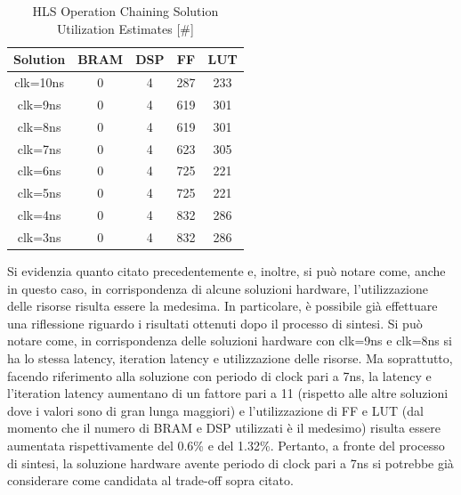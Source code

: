 \begin{table}[H]
    \centering
    \begin{tabular}{|c|c|c|c|c|}
        \hline
        \textbf{Solution} & \textbf{BRAM} & \textbf{DSP} & \textbf{FF} & \textbf{LUT} \\
        \hline
        clk=10ns & 0 & 4 & 287 & 233 \\
        \hline
        clk=9ns & 0 & 4 & 619 & 301 \\
        \hline
        clk=8ns & 0 & 4 & 619 & 301 \\
        \hline
        clk=7ns & 0 & 4 & 623 & 305 \\
        \hline
        clk=6ns & 0 & 4 & 725 & 221 \\
        \hline
        clk=5ns & 0 & 4 & 725 & 221 \\
        \hline
        clk=4ns & 0 & 4 & 832 & 286 \\
        \hline
        clk=3ns & 0 & 4 & 832 & 286 \\
        \hline
    \end{tabular}
    \caption{HLS Operation Chaining Solution Utilization Estimates [\#]}
    \label{tab:vivado-operation-chaining-solution-utilization-report}
\end{table}
Si evidenzia quanto citato precedentemente e, inoltre, si può notare come, anche in questo caso, in corrispondenza di alcune soluzioni hardware, l'utilizzazione delle risorse risulta essere la medesima. In particolare, è possibile già effettuare una riflessione riguardo i risultati ottenuti dopo il processo di sintesi. Si può notare come, in corrispondenza delle soluzioni hardware con clk=9ns e clk=8ns si ha lo stessa latency, iteration latency e utilizzazione delle risorse. Ma soprattutto, facendo riferimento alla soluzione con periodo di clock pari a 7ns, la latency e l'iteration latency aumentano di un fattore pari a 11 (rispetto alle altre soluzioni dove i valori sono di gran lunga maggiori) e l'utilizzazione di FF e LUT (dal momento che il numero di BRAM e DSP utilizzati è il medesimo) risulta essere aumentata rispettivamente del 0.6\% e del 1.32\%. Pertanto, a fronte del processo di sintesi, la soluzione hardware avente periodo di clock pari a 7ns si potrebbe già considerare come candidata al trade-off sopra citato.

